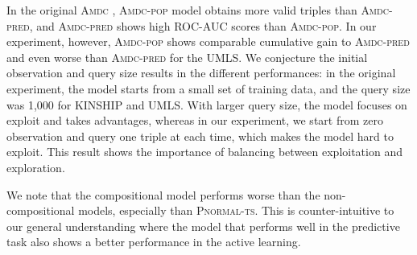 In the original \textsc{Amdc} \cite{kajino2015active}, \textsc{Amdc-pop} model obtains more
valid triples than \textsc{Amdc-pred}, and \textsc{Amdc-pred} shows high ROC-AUC scores than \textsc{Amdc-pop}.
In our experiment, however, \textsc{Amdc-pop} shows comparable cumulative gain to \textsc{Amdc-pred}
and even worse than \textsc{Amdc-pred} for the UMLS. We conjecture the initial observation and query size results in the different performances: in the original experiment, the model starts
from a small set of training data, and the query size was 1,000 for KINSHIP and UMLS. With larger query size, the model focuses on exploit and takes advantages, whereas in our experiment, we start from zero observation and query one triple at each time, which makes the model hard to exploit. This result shows
the importance of balancing between exploitation and exploration.


We note that the compositional model performs worse than the non-compositional models,
especially than \textsc{Pnormal-ts}.
This is counter-intuitive to our general understanding where
the model that performs well in the predictive task also shows
a better performance in the active learning.

